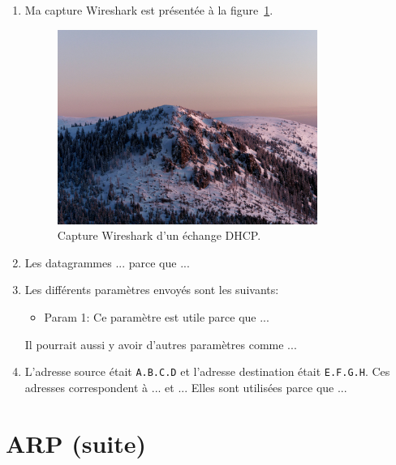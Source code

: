 \documentclass[]{article}
\begin{document}
\begin{enumerate}
    \item Ma capture Wireshark est présentée à la figure~\ref{fig:wireshark-dhcp}.

    \begin{figure} 
        \centering
        \includegraphics[width=0.8\textwidth]{./mountain-img.jpg} %
        \caption[]{Capture Wireshark d'un échange DHCP.}
        \label{fig:wireshark-dhcp}
    \end{figure}

    \item Les datagrammes ... parce que ...

    \item Les différents paramètres envoyés sont les suivants:

    \begin{itemize}
        \item Param 1: Ce paramètre est utile parce que ...
    \end{itemize}

    Il pourrait aussi y avoir d'autres paramètres comme ...

    \item L'adresse source était \texttt{A.B.C.D} et l'adresse destination était
          \texttt{E.F.G.H}. Ces adresses correspondent à ... et ... Elles sont
          utilisées parce que ...

\end{enumerate}

\section*{ARP (suite)}
\end{document}
